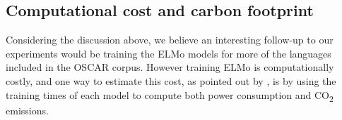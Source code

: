 \subsection{Computational cost and carbon footprint}\label{cost}

Considering the discussion above, we believe an interesting follow-up to our experiments would be training the ELMo models for more of the languages included in the OSCAR corpus. However training ELMo is computationally costly, and one way to estimate this cost, as pointed out by \citet{strubell-etal-2019-energy}, is by using the training times of each model to compute both power consumption and CO\textsubscript{2} emissions.

\begin{table}[t]
    \centering\small
\end{table}

